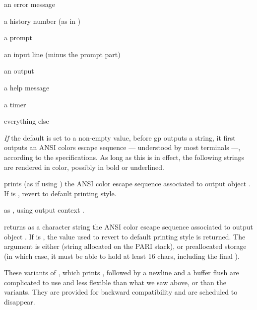 \item {} an error message

\item {} a history number (as in )

\item {} a prompt

\item {} an input line (minus the prompt part)

\item {} an output

\item {} a help message

\item {} a timer

\item {} everything else

\emph{If} the  default is set to a non-empty value, before gp
outputs a string, it first outputs an ANSI colors escape sequence ---
understood by most terminals ---, according to the 
specifications. As long as this is in effect, the following strings are
rendered in color, possibly in bold or underlined.

 prints (as if using ) the ANSI
color escape sequence associated to output object . If  is
, revert to default printing style.

 as ,
using output context .

 returns as a character
string the ANSI color escape sequence associated to output object .
If  is , the value used to revert to default printing
style is returned. The argument  is either  (string
allocated on the PARI stack), or preallocated storage (in which case, it must
be able to hold at least 16 chars, including the final ).


These variants of , which prints , followed by
a newline and a buffer flush are complicated to use and less flexible
than what we saw above, or than the  variants. They are
provided for backward compatibility and are scheduled to disappear.


